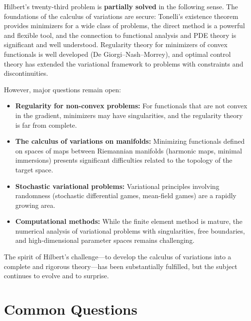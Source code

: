 \begin{partiallybox}
Hilbert's twenty-third problem is \textbf{partially solved} in the following sense. The foundations of the calculus of variations are secure: Tonelli's existence theorem provides minimizers for a wide class of problems, the direct method is a powerful and flexible tool, and the connection to functional analysis and PDE theory is significant and well understood. Regularity theory for minimizers of convex functionals is well developed (De Giorgi--Nash--Morrey), and optimal control theory has extended the variational framework to problems with constraints and discontinuities.

However, major questions remain open:
\begin{itemize}
    \item \textbf{Regularity for non-convex problems:} For functionals that are not convex in the gradient, minimizers may have singularities, and the regularity theory is far from complete.
    \item \textbf{The calculus of variations on manifolds:} Minimizing functionals defined on spaces of maps between Riemannian manifolds (harmonic maps, minimal immersions) presents significant difficulties related to the topology of the target space.
    \item \textbf{Stochastic variational problems:} Variational principles involving randomness (stochastic differential games, mean-field games) are a rapidly growing area.
    \item \textbf{Computational methods:} While the finite element method is mature, the numerical analysis of variational problems with singularities, free boundaries, and high-dimensional parameter spaces remains challenging.
\end{itemize}

The spirit of Hilbert's challenge---to develop the calculus of variations into a complete and rigorous theory---has been substantially fulfilled, but the subject continues to evolve and to surprise.
\end{partiallybox}

\section*{Common Questions}

